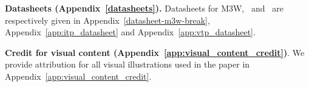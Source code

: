 \noindent
\textbf{Datasheets (Appendix~\ref{datasheets}).}
Datasheets for M3W, \shortimagetextpairs~and \shortvideotextpairs~are respectively given in Appendix~\ref{datasheet-m3w-break}, Appendix~\ref{app:itp_datasheet} and Appendix~\ref{app:vtp_datasheet}.

\noindent
\textbf{Credit for visual content (Appendix~\ref{app:visual_content_credit})}. 
We provide attribution for all visual illustrations used in the paper in Appendix~\ref{app:visual_content_credit}.




 


























